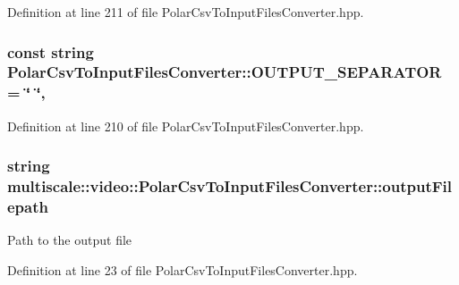 Definition at line 211 of file Polar\-Csv\-To\-Input\-Files\-Converter.\-hpp.

\hypertarget{classmultiscale_1_1video_1_1PolarCsvToInputFilesConverter_ad447c289e9cede69b3726cf21bfd9170}{
\subsubsection[{O\-U\-T\-P\-U\-T\-\_\-\-S\-E\-P\-A\-R\-A\-T\-O\-R}]{\setlength{\rightskip}{0pt plus 5cm}const string Polar\-Csv\-To\-Input\-Files\-Converter\-::\-O\-U\-T\-P\-U\-T\-\_\-\-S\-E\-P\-A\-R\-A\-T\-O\-R = \char`\"{} \char`\"{}\hspace{0.3cm}{\ttfamily [static]}, {\ttfamily [private]}}}\label{classmultiscale_1_1video_1_1PolarCsvToInputFilesConverter_ad447c289e9cede69b3726cf21bfd9170}


Definition at line 210 of file Polar\-Csv\-To\-Input\-Files\-Converter.\-hpp.

\hypertarget{classmultiscale_1_1video_1_1PolarCsvToInputFilesConverter_a1033d31c9bfc7ccad08337c7b0fa6e6e}{
\subsubsection[{output\-Filepath}]{\setlength{\rightskip}{0pt plus 5cm}string multiscale\-::video\-::\-Polar\-Csv\-To\-Input\-Files\-Converter\-::output\-Filepath\hspace{0.3cm}{\ttfamily [private]}}}\label{classmultiscale_1_1video_1_1PolarCsvToInputFilesConverter_a1033d31c9bfc7ccad08337c7b0fa6e6e}
Path to the output file 

Definition at line 23 of file Polar\-Csv\-To\-Input\-Files\-Converter.\-hpp.

